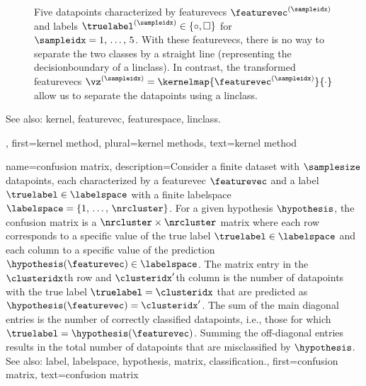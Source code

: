 {{\begin{figure}[H]
\begin{center}
			\end{center}
		\caption{Five \glspl{datapoint} characterized by \glspl{featurevec} $\featurevec^{(\sampleidx)}$ 
			and \glspl{label} $\truelabel^{(\sampleidx)} \in \{ \circ, \square \}$ for $\sampleidx=1, \,\ldots, \,5$. 
			With these \glspl{featurevec}, there is no way to separate the two classes 
			by a straight line (representing the \gls{decisionboundary} of a \gls{linclass}). 
			In contrast, the transformed \glspl{featurevec} $\vz^{(\sampleidx)} = \kernelmap{\featurevec^{(\sampleidx)}}{\cdot}$ 
			allow us to separate the \glspl{datapoint} using a \gls{linclass}.  \label{fig_linsep_kernel_dict}}
		\end{figure}
		See also: \gls{kernel}, \gls{featurevec}, \gls{featurespace}, \gls{linclass}.},
	first={kernel method},
	plural={kernel methods},
	text={kernel method} 
}
	
{name={confusion matrix}, 
	description={Consider a finite \gls{dataset} 
		with $\samplesize$ \glspl{datapoint}, each characterized 
		by a \gls{featurevec} $\featurevec$ and a \gls{label} 
		$\truelabel \in \labelspace$ with a finite \gls{labelspace} $\labelspace = \{1, \,\ldots, \,\nrcluster\}$. 
		For a given \gls{hypothesis} $\hypothesis$, the confusion \gls{matrix} is a 
		$\nrcluster \times \nrcluster$ \gls{matrix} where each row corresponds 
		to a specific value of the true \gls{label} $\truelabel \in \labelspace$ 
		and each column to a specific value of the \gls{prediction} $\hypothesis(\featurevec) \in \labelspace$. 
		The \gls{matrix} entry in the $\clusteridx$th row and $\clusteridx'$th 
		column is the number of \glspl{datapoint} with the true \gls{label} 
		$\truelabel = \clusteridx$ that are predicted as 
		$\hypothesis(\featurevec) = \clusteridx'$. The sum of the main 
		diagonal entries is the number of correctly classified 
		\glspl{datapoint}, i.e., those for which $\truelabel = \hypothesis(\featurevec)$. 
		Summing the off-diagonal entries results in the total number of \glspl{datapoint} 
		that are misclassified by $\hypothesis$.
				\\
		See also: \gls{label}, \gls{labelspace}, \gls{hypothesis}, \gls{matrix}, \gls{classification}.},
	first={confusion matrix},
	text={confusion matrix} 
}

